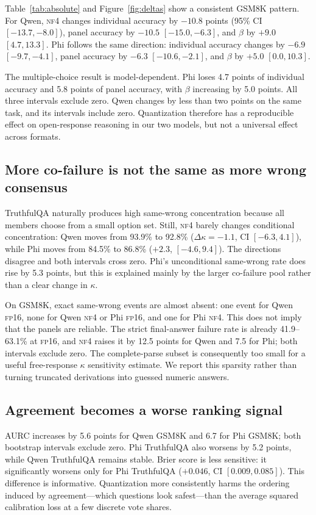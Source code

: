 \documentclass[11pt]{article}
\newcommand{\nf}{\textsc{nf4}}
\newcommand{\fp}{\textsc{fp16}}
\begin{document}
Table~\ref{tab:absolute} and Figure~\ref{fig:deltas} show a consistent GSM8K pattern. For Qwen, \nf{} changes individual accuracy by $-10.8$ points (95\% CI $[-13.7,-8.0]$), panel accuracy by $-10.5$ $[-15.0,-6.3]$, and $\beta$ by $+9.0$ $[4.7,13.3]$. Phi follows the same direction: individual accuracy changes by $-6.9$ $[-9.7,-4.1]$, panel accuracy by $-6.3$ $[-10.6,-2.1]$, and $\beta$ by $+5.0$ $[0.0,10.3]$.

The multiple-choice result is model-dependent. Phi loses 4.7 points of individual accuracy and 5.8 points of panel accuracy, with $\beta$ increasing by 5.0 points. All three intervals exclude zero. Qwen changes by less than two points on the same task, and its intervals include zero. Quantization therefore has a reproducible effect on open-response reasoning in our two models, but not a universal effect across formats.

\subsection{More co-failure is not the same as more wrong consensus}

TruthfulQA naturally produces high same-wrong concentration because all members choose from a small option set. Still, \nf{} barely changes conditional concentration: Qwen moves from 93.9\% to 92.8\% ($\Delta\kappa=-1.1$, CI $[-6.3,4.1]$), while Phi moves from 84.5\% to 86.8\% ($+2.3$, $[-4.6,9.4]$). The directions disagree and both intervals cross zero. Phi's unconditional same-wrong rate does rise by 5.3 points, but this is explained mainly by the larger co-failure pool rather than a clear change in $\kappa$.

On GSM8K, exact same-wrong events are almost absent: one event for Qwen \fp{}, none for Qwen \nf{} or Phi \fp{}, and one for Phi \nf{}. This does not imply that the panels are reliable. The strict final-answer failure rate is already 41.9--63.1\% at \fp{}, and \nf{} raises it by 12.5 points for Qwen and 7.5 for Phi; both intervals exclude zero. The complete-parse subset is consequently too small for a useful free-response $\kappa$ sensitivity estimate. We report this sparsity rather than turning truncated derivations into guessed numeric answers.

\subsection{Agreement becomes a worse ranking signal}

AURC increases by 5.6 points for Qwen GSM8K and 6.7 for Phi GSM8K; both bootstrap intervals exclude zero. Phi TruthfulQA also worsens by 5.2 points, while Qwen TruthfulQA remains stable. Brier score is less sensitive: it significantly worsens only for Phi TruthfulQA ($+0.046$, CI $[0.009,0.085]$). This difference is informative. Quantization more consistently harms the ordering induced by agreement---which questions look safest---than the average squared calibration loss at a few discrete vote shares.
\end{document}
